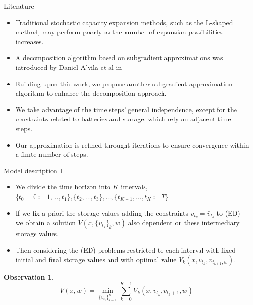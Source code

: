 \documentclass[11pt, aspectratio=169]{beamer}
\newtheorem{oss}[theorem]{Observation}
\begin{document}
\begin{frame}{Literature}
  \begin{itemize}
    \item Traditional stochastic capacity expansion methods, such as the L-shaped method, may perform poorly as the number of expansion possibilities increases.
    \item A decomposition algorithm based on subgradient approximations was introduced by Daniel A'vila et al in \cite{DecompAlg}
    \item Building upon this work, we propose another subgradient approximation algorithm to enhance the decomposition approach.
    \item We take advantage of the time steps' general independence, except for the constraints related to batteries and storage, which rely on adjacent time steps.
    \item Our approximation is refined throught iterations to ensure convergence within a finite number of steps.
  \end{itemize}
\end{frame}

\begin{frame}{Model description 1}
  \begin{itemize}
    \item We divide the time horizon into \(K\) intervals, \(\{t_{0} = 0 \coloneqq 1,\ldots, t_{1}\},\{t_2,\ldots,t_3\},\ldots,\{t_{K-1},\ldots,t_K \coloneqq T\}\)
    \item If we fix a priori the storage values adding the constraints \( v_{t_{k}} = \bar v_{t_{k}}\) to (ED) we obtain a solution \(V(x,\{v_{t_{k}}\}_k, w)\) also dependent on these intermediary storage values.
    \item Then considering the (ED) problems restricted to each interval with fixed initial and final storage values and with optimal value \(V_{k}(x,v_{t_{k}},v_{t_{k+1},w})\).
  \end{itemize}
  
  \begin{oss}
    \begin{equation}\label{Divided ED eq}
      V(x,w) = \min_{\{v_{t_k}\}_{k=1}^K}\sum_{k=0}^{K-1}V_{k}(x,v_{t_{k}},v_{t_k+1},w)
    \end{equation}
  \end{oss}

\end{frame}
\end{document}
